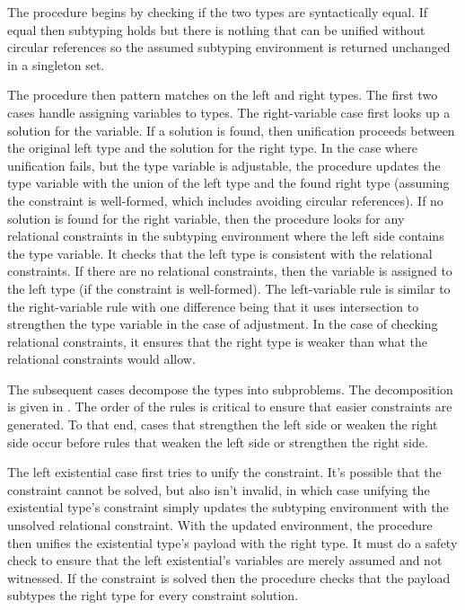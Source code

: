 \documentclass[acmsmall]{acmart}
\theoremstyle{definition}
\begin{document}
The procedure begins by checking if the two types are syntactically equal.
If equal then subtyping holds but there is nothing that can be unified 
without circular references so the assumed subtyping environment is returned 
unchanged in a singleton set. 

The procedure then pattern matches on the left and right types. 
The first two cases handle assigning variables to types.
The right-variable case first looks up a solution  
for the variable. If a solution is found, then unification proceeds
between the original left type and the solution for the right type.
In the case where unification fails, but the type variable is adjustable,
the procedure updates the type variable with the union of the left type
and the found right type (assuming the constraint is well-formed, 
which includes avoiding circular references). 
If no solution is found for the right variable, then 
the procedure looks for any relational constraints in the subtyping environment
where the left side contains the type variable.
It checks that the left type is consistent with the relational constraints. 
If there are no relational constraints, then the variable is assigned
to the left type (if the constraint is well-formed).
The left-variable rule is similar to the right-variable rule with
one difference being that it uses intersection to strengthen the type variable 
in the case of adjustment. In the case of checking relational constraints, it
ensures that the right type is weaker than what the relational constraints would allow. 

The subsequent cases decompose the types into subproblems. 
The decomposition is given in . 
The order of the rules 
is critical to ensure that easier constraints are generated. To that end, cases that
strengthen the left side or weaken the right side occur before rules that
weaken the left side or strengthen the right side.

The left existential case first tries to unify the constraint. It's possible that the
constraint cannot be solved, but also isn't invalid, in which case unifying the existential type's constraint 
simply updates the subtyping environment with the unsolved relational constraint. 
With the updated environment, the procedure then unifies the existential type's payload with the right type.
It must do a safety check to ensure that 
the left existential's variables are merely assumed and not witnessed. 
If the constraint is solved then the procedure 
checks that the payload subtypes the right type for every constraint solution.
\end{document}
